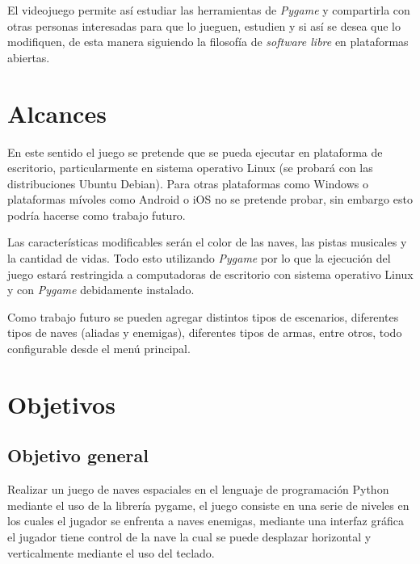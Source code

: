 \documentclass[12pt,letterpaper]{article}
\begin{document}
El videojuego permite así estudiar las herramientas de \textit{Pygame} y compartirla con otras personas interesadas para que lo jueguen, estudien y si así se desea que lo modifiquen,  de esta manera siguiendo la filosofía de \textit{software libre} en plataformas abiertas.


 
\section{Alcances}
En este sentido el juego se pretende que se pueda ejecutar en plataforma de escritorio, particularmente en sistema operativo Linux (se probará con las distribuciones Ubuntu  Debian). Para otras plataformas como Windows o plataformas mívoles como Android o iOS no se pretende probar, sin embargo esto podría hacerse como trabajo futuro. 

Las características modificables serán el color de las naves, las pistas musicales y la cantidad de vidas. Todo esto utilizando \textit{Pygame} por lo que la ejecución del juego estará restringida a computadoras de escritorio con sistema operativo Linux y con \textit{Pygame} debidamente instalado.

Como trabajo futuro se pueden agregar distintos tipos de escenarios, diferentes tipos de naves (aliadas y enemigas), diferentes tipos de armas, entre otros, todo configurable desde el menú principal. 


\section{Objetivos} 
\subsection{Objetivo general}
Realizar un juego de naves espaciales en el lenguaje de programación Python mediante el uso de la librería pygame, el juego consiste en una serie de niveles en los cuales el jugador se enfrenta a naves enemigas, mediante una interfaz gráfica el jugador tiene control de la nave la cual se puede desplazar horizontal y verticalmente mediante el uso del teclado.
\end{document}
